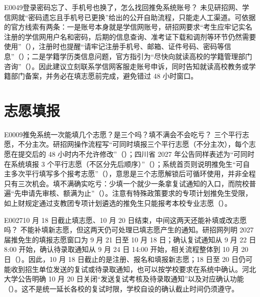 \begin{qa}{E0049}{登录密码忘了、手机号也换了，怎么找回推免系统账号？}
未见研招网、学信网就“密码遗忘且手机号已更换”给出的公开自助流程，只能走人工渠道。可依据的官方线索有两条：一是账号本身就是学信网账号，研招网要求“考生应牢记实名注册的学信网用户名和密码，后期的信息查询、准考证下载和调剂等环节仍然需要使用”（），注册时也提醒“请牢记注册手机号、邮箱、证件号码、密码等信息”（）；二是学籍学历类信息问题，官方指引为“尽快向就读高校的学籍管理部门咨询”（）。因此建议立刻联系学信网客服走账号申诉，同时告知就读高校教务或学籍部门备案，并务必在填志愿前完成，避免错过 48 小时窗口。
\end{qa}

\section{志愿填报}
\begin{qa}{E0009}{推免系统一次能填几个志愿？是三个吗？填不满会不会吃亏？}
三个平行志愿，不分主次。研招网操作流程写“可同时填报三个平行志愿（不分主次），每个志愿在提交后的 48 小时内不允许修改”（）；四川省 2027 年公告同样表述为“可同时在系统填报 3 个平行志愿（不区分先后顺序）”（）；系统首页则说明推免生“可自主多次平行填写多个报考志愿”（），意思是三个志愿解锁后可循环使用，并非全程只有三次机会。填不满确实吃亏：少填一个就少一条拿复试通知的入口，而院校普遍“先申请先审核、额满为止”（）。注意有特殊政策要求的专项计划推免生受限，如上财规定通过支教团专项计划遴选的推免生只能报考本校专业志愿（）。
\end{qa}

\begin{qa}{E0027}{10 月 18 日截止填志愿、10 月 20 日结束，中间这两天还能补填或改志愿吗？}
不能补填新志愿，但这两天仍可处理已填志愿产生的通知。研招网列明 2027 届推免生的填报志愿窗口为 9 月 21 日至 10 月 18 日；确认复试通知从 9 月 22 日 8:00 开始，确认待录取通知从 9 月 24 日 14:00 开始，相关流程整体到 10 月 20 日（）。因此，10 月 18 日截止的是注册、报名和填报新志愿；18 日至 20 日仍可能收到招生单位发送的复试或待录取通知，也可以按学校要求在系统中确认。河北大学公告明确 10 月 20 日关闭“发送复试考核及待录取通知”以及对应确认功能（）。这不是统一延长各校的复试时限，学校自设的确认截止时间仍须遵守。
\end{qa}


